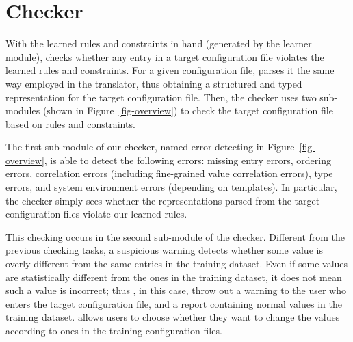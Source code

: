 
\section{Checker}
\label{sec-checker}

With the learned rules and constraints in hand (generated
by the learner module),
\app checks whether any entry in a target configuration file
violates the learned rules and constraints.
For a given configuration file, \app parses it the same
way employed in the translator, thus obtaining a structured
and typed representation for the target configuration file.
Then, the checker uses two sub-modules (shown in 
Figure~\ref{fig-overview}) to check the target
configuration file based on rules and constraints.

The first sub-module of our checker,
named error detecting in Figure~\ref{fig-overview}, 
is able to detect the following errors:
missing entry errors, ordering errors, 
correlation errors (including fine-grained value correlation errors),
type errors, and system environment errors (depending on templates).
In particular, the checker simply sees whether the representations 
parsed from the target configuration files violate our
learned rules.

This checking occurs in the second sub-module of the checker.
Different from the previous checking tasks,
a suspicious warning detects whether some value
is overly different from the same entries in the
training dataset. Even if some values are statistically different
from the ones in the training dataset, 
it does not mean such a value is incorrect;
thus \app, in this case, throw out a warning to the user who
enters the target configuration file, and a report containing 
normal values in the training dataset.
\app allows users to choose whether they want to change 
the values according to ones in the training configuration
files.
